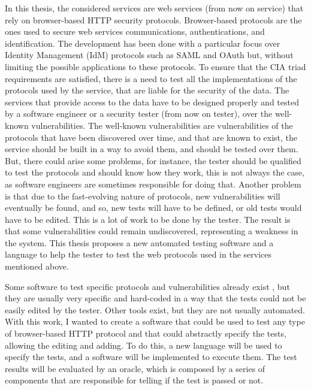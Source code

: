 In this thesis, the considered services are web services (from now on service) that rely on browser-based HTTP security protocols. Browser-based protocols are the ones used to secure web services communications, authentications, and identification. The development has been done with a particular focus over Identity Management (IdM) protocols such as \gls{SAML} and \gls{OAuth} but, without limiting the possible applications to these protocols.
To ensure that the CIA triad requirements are satisfied, there is a need to test all the implementations of the protocols used by the service, that are liable for the security of the data. The services that provide access to the data have to be designed properly and tested by a software engineer or a security tester (from now on tester), over the well-known vulnerabilities. The well-known vulnerabilities are vulnerabilities of the protocols that have been discovered over time, and that are known to exist, the service should be built in a way to avoid them, and should be tested over them. But, there could arise some problems, for instance, the tester should be qualified to test the protocols and should know how they work, this is not always the case, as software engineers are sometimes responsible for doing that. Another problem is that due to the fast-evolving nature of protocols, new vulnerabilities will eventually be found, and so, new tests will have to be defined, or old tests would have to be edited. This is a lot of work to be done by the tester. The result is that some vulnerabilities could remain undiscovered, representing a weakness in the system. This thesis proposes a new automated testing software and a language to help the tester to test the web protocols used in the services mentioned above. 

Some software to test specific protocols and vulnerabilities already exist \cite{wendy_barreto,claudio_grisenti}, but they are usually very specific and hard-coded in a way that the tests could not be easily edited by the tester. Other tools exist, but they are not usually automated. With this work, I wanted to create a software that could be used to test any type of browser-based HTTP protocol and that could abstractly specify the tests, allowing the editing and adding. To do this, a new language will be used to specify the tests, and a software will be implemented to execute them. The test results will be evaluated by an oracle, which is composed by a series of components that are responsible for telling if the test is passed or not.

